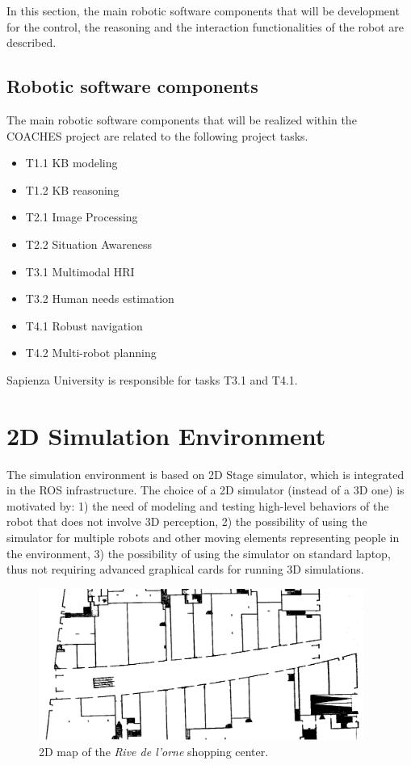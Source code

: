 \documentclass{article}
\begin{document}
In this section, the main robotic software components that will be development for the control, the reasoning and the interaction functionalities of the robot are described.

\subsection{Robotic software components}

The main robotic software components that will be realized within the COACHES project are related to the following project tasks.
\begin{itemize}
\item T1.1 KB modeling
\item T1.2 KB reasoning
\item T2.1 Image Processing
\item T2.2 Situation Awareness
\item T3.1 Multimodal HRI
\item T3.2 Human needs estimation
\item T4.1 Robust navigation
\item T4.2 Multi-robot planning
\end{itemize}

Sapienza University is responsible for tasks T3.1 and T4.1.


\section{2D Simulation Environment}

The simulation environment is based on 2D Stage simulator, which is integrated in the ROS infrastructure. The choice of a 2D simulator (instead of a 3D one) is motivated by: 1) the need of modeling and testing high-level behaviors of the robot that does not involve 3D perception, 2) the possibility of using the simulator for multiple robots and other moving elements representing people in the environment, 3) the possibility of using the simulator on standard laptop, thus not requiring advanced graphical cards for running 3D simulations.

\begin{figure}
\includegraphics[width=0.95\textwidth]{Rive1.png}
\caption{2D map of the \emph{Rive de l'orne} shopping center.}
\label{fig:stage}
\end{figure}
\end{document}
